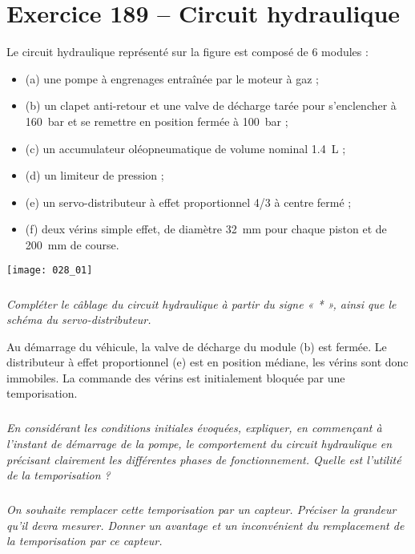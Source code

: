 \section*{Exercice 189 -- Circuit hydraulique}
\setcounter{exo}{0}


Le circuit hydraulique représenté sur la figure est composé de 6 modules :
\begin{itemize}
\item (a)	une pompe à engrenages entraînée par le moteur à gaz ;
\item (b)	un clapet anti-retour et une valve de décharge tarée pour s'enclencher à \SI{160}{bar} et se remettre en position fermée à \SI{100}{bar} ;
\item (c)	un accumulateur oléopneumatique de volume nominal \SI{1,4}{L} ;
\item (d)	un limiteur de pression ;
\item (e)	un servo-distributeur à effet proportionnel 4/3 à centre fermé ;
\item (f)	deux vérins simple effet, de diamètre \SI{32}{mm} pour chaque piston et de \SI{200}{mm} de course.
\end{itemize}

\begin{center}
\texttt{[image: 028\_01]}
\end{center}
\subparagraph{}\textit{Compléter le câblage du circuit hydraulique à partir du signe « * », ainsi que le schéma du servo-distributeur.}
\ifprof
\begin{corrige}
\end{corrige}
\else
\fi

Au démarrage du véhicule, la valve de décharge du module (b) est fermée. Le distributeur à effet proportionnel (e) est en position médiane, les vérins sont donc immobiles. La commande des vérins est initialement bloquée par une temporisation.

\subparagraph{}\textit{En considérant les conditions initiales évoquées, expliquer, en commençant à l'instant de démarrage de la pompe, le comportement du circuit hydraulique en précisant clairement les différentes phases de fonctionnement. Quelle est l'utilité de la temporisation ? }
\ifprof
\begin{corrige}
\end{corrige}
\else
\fi

\subparagraph{}\textit{On souhaite remplacer cette temporisation par un capteur. Préciser la grandeur qu'il devra mesurer. Donner un avantage et un inconvénient du remplacement de la temporisation par ce capteur.}
\ifprof
\begin{corrige}
\end{corrige}
\else
\fi
